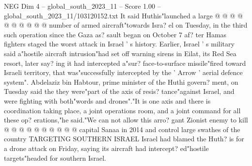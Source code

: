\begin{textsample}{NEG Dim 4 – global\_south\_2023\_11 – Score 1.00 – global\_south\_2023\_11/103120152.txt}
It said Huthis"launched a large @ @ @ @ @ @ @ @ @ @ number of armed aircraft"towards Isra? el on Tuesday, in the third such operation since the Gaza as? sault began on October 7 af? ter Hamas fighters staged the worst attack in Israel ' s history.
Earlier, Israel ' s military said a"hostile aircraft intrusion"had set off warning sirens in Eilat, its Red Sea resort, later say? ing it had intercepted a"sur? face-to-surface missile"fired toward Israeli territory, that was"successfully intercepted by the ' Arrow ' aerial defence system".
Abdelaziz bin Habtour, prime minister of the Huthi govern? ment, on Tuesday said the they were"part of the axis of resis? tance"against Israel, and were fighting with both"words and drones"."It is one axis and there is coordination taking place, a joint operations room, and a joint command for all these op? erations,"he said."We can not allow this arro? gant Zionist enemy to kill @ @ @ @ @ @ @ @ @ @ capital Sanaa in 2014 and control large swathes of the country TARGETING SOUTHERN ISRAEL Israel had blamed the Huth? is for a drone attack on Friday, saying its aircraft had intercept? ed"hostile targets"headed for southern Israel.

\end{textsample}
